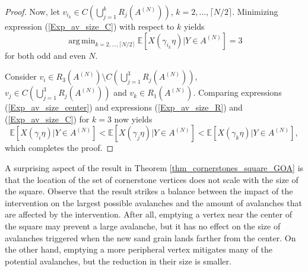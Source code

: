 \documentclass{article}
\DeclareMathOperator*{\argmin}{arg\,min}
\begin{document}
\begin{proof}
    Now, let $v_{i_k} \in C\left(\bigcup_{j=1}^k R_j(A^{(N)})\right)$, $k = 2, \ldots, \lceil N/2 \rceil$. Minimizing expression (\ref{Exp_av_size_C}) with respect to $k$ yields
    \begin{equation*}
        \argmin_{k = 2, \ldots, \lceil N/2 \rceil} \mathbb{E}[X(\gamma_{i_k} \eta)|Y \in A^{(N)}] = 3
    \end{equation*}
    for both odd and even $N$. 

    Consider $v_i \in R_3(A^{(N)}) \setminus C\left(\bigcup_{j=1}^3 R_j(A^{(N)})\right)$, $v_j \in C\left(\bigcup_{j=1}^3 R_j(A^{(N)})\right)$ and $v_k \in R_1(A^{(N)})$. 
    Comparing expressions (\ref{Exp_av_size_center}) and expressions (\ref{Exp_av_size_R}) and (\ref{Exp_av_size_C}) for $k = 3$ now yields
    \begin{equation*}
        \mathbb{E}[X(\gamma_i \eta)|Y \in A^{(N)}] < \mathbb{E}[X(\gamma_j \eta)|Y \in A^{(N)}] < \mathbb{E}[X(\gamma_k \eta)|Y \in A^{(N)}],
    \end{equation*}
    which completes the proof.
\end{proof}
A surprising aspect of the result in Theorem \ref{thm_cornerstones_square_GOA} is that the location of the set of cornerstone vertices does not scale with the size of the square. Observe that the result strikes a balance between the impact of the intervention on the largest possible avalanches and the amount of avalanches that are affected by the intervention. After all, emptying a vertex near the center of the square may prevent a large avalanche, but it has no effect on the size of avalanches triggered when the new sand grain lands farther from the center. On the other hand, emptying a more peripheral vertex mitigates many of the potential avalanches, but the reduction in their size is smaller. 
\end{document}
